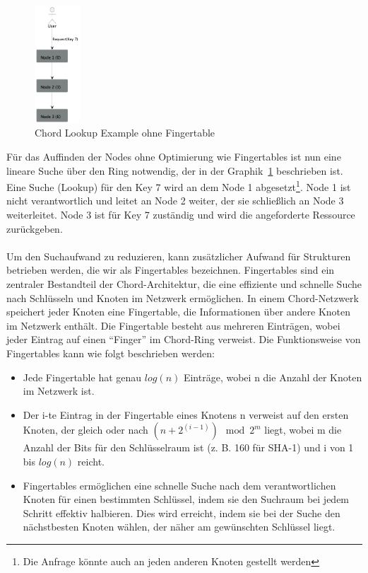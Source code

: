 \documentclass[../vs-script-first-v01.tex]{subfiles}
\begin{document}
\begin{figure}[!ht]
  \centering
  \includegraphics[width=0.15\textwidth]{fig/uml/chord.png}
  \caption{Chord Lookup Example ohne Fingertable}
  \label{fig:chord-lookup}
\end{figure}
Für das Auffinden der Nodes ohne Optimierung wie Fingertables ist nun eine lineare Suche über den Ring notwendig, der in der Graphik~\ref{fig:chord-lookup} beschrieben ist. Eine Suche (Lookup) für den Key 7 wird an dem Node 1 abgesetzt\footnote{Die Anfrage könnte auch an jeden anderen Knoten gestellt werden}. Node 1 ist nicht verantwortlich und leitet an Node 2 weiter, der sie schließlich an Node 3 weiterleitet. Node 3 ist für Key 7 zuständig und wird die angeforderte Ressource zurückgeben.
\\\\
Um den Suchaufwand zu reduzieren, kann zusätzlicher Aufwand für Strukturen betrieben werden, die wir als Fingertables bezeichnen. 
Fingertables sind ein zentraler Bestandteil der Chord-Architektur, die eine effiziente und schnelle Suche nach Schlüsseln und Knoten im Netzwerk ermöglichen. In einem Chord-Netzwerk speichert jeder Knoten eine Fingertable, die Informationen über andere Knoten im Netzwerk enthält. Die Fingertable besteht aus mehreren Einträgen, wobei jeder Eintrag auf einen \enquote{Finger} im Chord-Ring verweist. Die Funktionsweise von Fingertables kann wie folgt beschrieben werden:
\begin{itemize} 
\item Jede Fingertable hat genau $log(n)$ Einträge, wobei n die Anzahl der Knoten im Netzwerk ist.
\item Der i-te Eintrag in der Fingertable eines Knotens n verweist auf den ersten Knoten, der gleich oder nach $(n + 2^{(i-1)}) \mod 2^m$ liegt, wobei m die Anzahl der Bits für den Schlüsselraum ist (z. B. 160 für SHA-1) und i von 1 bis $log(n)$ reicht.
\item Fingertables ermöglichen eine schnelle Suche nach dem verantwortlichen Knoten für einen bestimmten Schlüssel, indem sie den Suchraum bei jedem Schritt effektiv halbieren. Dies wird erreicht, indem sie bei der Suche den nächstbesten Knoten wählen, der näher am gewünschten Schlüssel liegt.
\end{itemize} 
\end{document}
